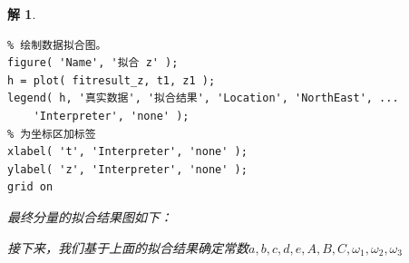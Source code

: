 \documentclass[a4paper, 12pt]{ctexart}
\newtheorem*{theorem}{解}
\begin{document}
\begin{theorem}
\begin{lstlisting}
% 绘制数据拟合图。
figure( 'Name', '拟合 z' );
h = plot( fitresult_z, t1, z1 );
legend( h, '真实数据', '拟合结果', 'Location', 'NorthEast', ...
    'Interpreter', 'none' );
% 为坐标区加标签
xlabel( 't', 'Interpreter', 'none' );
ylabel( 'z', 'Interpreter', 'none' );
grid on
    \end{lstlisting}
    最终分量的拟合结果图如下：
    \begin{figure}[h]
        \centering
        \nonumber
    \end{figure}
    接下来，我们基于上面的拟合结果确定常数$a,b,c,d,e,A,B,C,\omega_1,\omega_2,\omega_3$

\end{theorem}
\end{document}
